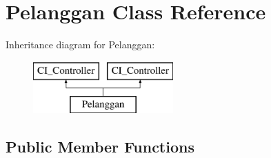 \hypertarget{class_pelanggan}{}\section{Pelanggan Class Reference}
\label{class_pelanggan}
Inheritance diagram for Pelanggan\+:\begin{figure}[H]
\begin{center}
\leavevmode
\includegraphics[height=2.000000cm]{class_pelanggan}
\end{center}
\end{figure}
\subsection*{Public Member Functions}
